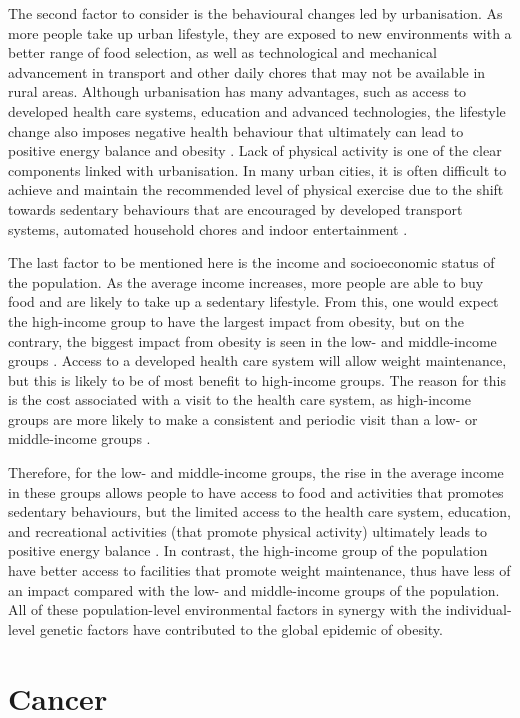 The second factor to consider is the behavioural changes led by urbanisation.
As more people take up urban lifestyle, they are exposed to new environments with a better range of food selection, as well as technological and mechanical advancement in transport and other daily chores that may not be available in rural areas.
Although urbanisation has many advantages, such as access to developed health care systems, education and advanced technologies, the lifestyle change also imposes negative health behaviour that ultimately can lead to positive energy balance and obesity \citep{Malik2013}.
Lack of physical activity is one of the clear components linked with urbanisation.
In many urban cities, it is often difficult to achieve and maintain the recommended level of physical exercise due to the shift towards sedentary behaviours that are encouraged by developed transport systems, automated household chores and indoor entertainment \citep{Malik2013}.

The last factor to be mentioned here is the income and socioeconomic status of the population.
As the average income increases, more people are able to buy food and are likely to take up a sedentary lifestyle.
From this, one would expect the high-income group to have the largest impact from obesity, but on the contrary, the biggest impact from obesity is seen in the low- and middle-income groups \citep{Malik2013}.
Access to a developed health care system will allow weight maintenance, but this is likely to be of most benefit to high-income groups.
The reason for this is the cost associated with a visit to the health care system, as high-income groups are more likely to make a consistent and periodic visit than a low- or middle-income groups \citep{Malik2013}.

Therefore, for the low- and middle-income groups, the rise in the average income in these groups allows people to have access to food and activities that promotes sedentary behaviours, but the limited access to the health care system, education, and recreational activities (that promote physical activity) ultimately leads to positive energy balance \citep{Malik2013}.
In contrast, the high-income group of the population have better access to facilities that promote weight maintenance, thus have less of an impact compared with the low- and middle-income groups of the population.
All of these population-level environmental factors in synergy with the individual-level genetic factors have contributed to the global epidemic of obesity.

\section{Cancer}
\label{sec:cancer}

